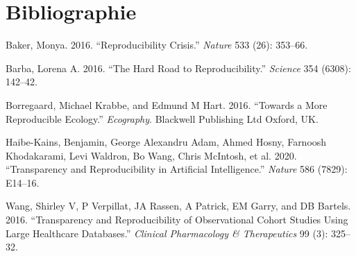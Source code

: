 \documentclass[9pt,twocolumn,twoside,]{pnas-new}
\newlength{\cslhangindent}
\newlength{\cslentryspacingunit} %
\newenvironment{CSLReferences}[2] %
 {%
  \setlength{\parindent}{0pt}
  \ifodd #1
  \let\oldpar\par
  \def\par{\hangindent=\cslhangindent\oldpar}
  \fi
  \setlength{\parskip}{#2\cslentryspacingunit}
 }%
 {}
\begin{document}
\newpage

\hypertarget{bibliographie}{%
\section*{Bibliographie}\label{bibliographie}}

\hypertarget{refs}{}
\begin{CSLReferences}{1}{0}
\leavevmode{}%
Baker, Monya. 2016. {``Reproducibility Crisis.''} \emph{Nature} 533
(26): 353--66.

\leavevmode{}%
Barba, Lorena A. 2016. {``The Hard Road to Reproducibility.''}
\emph{Science} 354 (6308): 142--42.

\leavevmode{}%
Borregaard, Michael Krabbe, and Edmund M Hart. 2016. {``Towards a More
Reproducible Ecology.''} \emph{Ecography}. Blackwell Publishing Ltd
Oxford, UK.

\leavevmode{}%
Haibe-Kains, Benjamin, George Alexandru Adam, Ahmed Hosny, Farnoosh
Khodakarami, Levi Waldron, Bo Wang, Chris McIntosh, et al. 2020.
{``Transparency and Reproducibility in Artificial Intelligence.''}
\emph{Nature} 586 (7829): E14--16.

\leavevmode{}%
Wang, Shirley V, P Verpillat, JA Rassen, A Patrick, EM Garry, and DB
Bartels. 2016. {``Transparency and Reproducibility of Observational
Cohort Studies Using Large Healthcare Databases.''} \emph{Clinical
Pharmacology \& Therapeutics} 99 (3): 325--32.

\end{CSLReferences}



% 
\end{document}
